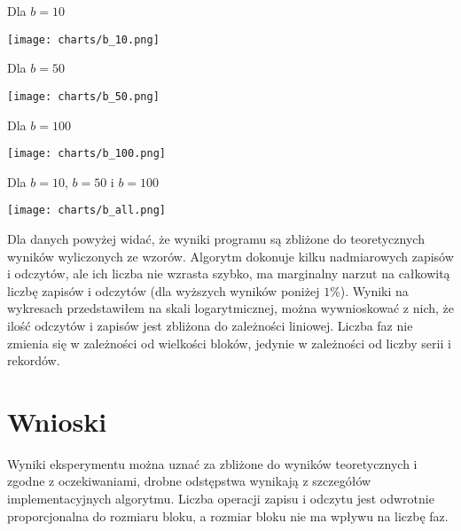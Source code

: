 \documentclass{article}
\begin{document}
\begin{center}
Dla $b=10$

\texttt{[image: charts/b\_10.png]}

Dla $b=50$

\texttt{[image: charts/b\_50.png]}

Dla $b=100$

\texttt{[image: charts/b\_100.png]}

Dla $b=10$, $b=50$ i $b=100$ 

\texttt{[image: charts/b\_all.png]}

\end{center}

Dla danych powyżej widać, że wyniki programu są zbliżone do teoretycznych wyników wyliczonych ze wzorów. Algorytm dokonuje kilku nadmiarowych zapisów i odczytów, ale ich liczba nie wzrasta szybko, ma marginalny narzut na całkowitą liczbę zapisów i odczytów (dla wyższych wyników poniżej $1\%$). Wyniki na wykresach przedstawiłem na skali logarytmicznej, można wywnioskować z nich, że ilość odczytów i zapisów jest zbliżona do zależności liniowej. Liczba faz nie zmienia się w zależności od wielkości bloków, jedynie w zależności od liczby serii i rekordów.  

\section{Wnioski}

Wyniki eksperymentu można uznać za zbliżone do wyników teoretycznych i zgodne z oczekiwaniami, drobne odstępstwa wynikają z szczegółów implementacyjnych algorytmu. Liczba operacji zapisu i odczytu jest odwrotnie proporcjonalna do rozmiaru bloku, a rozmiar bloku nie ma wpływu na liczbę faz.  
\end{document}
